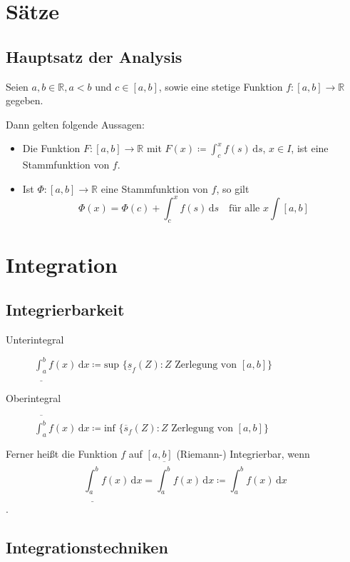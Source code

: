 		\section{Sätze}
			\subsection{Hauptsatz der Analysis}
				Seien $ a, b \in \mathbb{R}, a < b $ und $ c \in [a, b] $, sowie eine stetige Funktion $ f : [a, b] \rightarrow \mathbb{R} $ gegeben.

				Dann gelten folgende Aussagen:
				\begin{itemize}
					\item Die Funktion $ F : [a, b] \rightarrow \mathbb{R} $ mit $ F(x) \coloneqq \int _ c ^ x \! f(s) \, \mathrm{d}s $, $ x \in I $, ist eine Stammfunktion von $ f $.
					\item Ist $ \Phi : [a, b] \rightarrow \mathbb{R} $ eine Stammfunktion von $ f $, so gilt \[ \Phi(x) = \Phi(c) + \int _ c ^ x \! f(s) \, \mathrm{d}s \quad\text{für alle } x \int [a, b] \]
				\end{itemize}

		\section{Integration}
			\subsection{Integrierbarkeit}
				\begin{description}
					\item[Unterintegral] $ \underline{\int _ a ^ b} \! f(x) \, \mathrm{d}x \coloneqq \text{sup } \{ \underline{s} _ f (Z) : Z \text{ Zerlegung von } [a, b] \} $
					\item[Oberintegral] $ \overline{\int _ a ^ b} \! f(x) \, \mathrm{d}x \coloneqq \text{inf } \{ \overline{s} _ f (Z) : Z \text{ Zerlegung von } [a, b] \} $
				\end{description}

				Ferner heißt die Funktion $ f $ auf $ [a, b] $ (Riemann-) Integrierbar, wenn \[ \underline{\int _ a ^ b} \! f(x) \, \mathrm{d}x = \overline{\int _ a ^ b} \! f(x) \, \mathrm{d}x \coloneqq \int _ a ^ b \! f(x) \, \mathrm{d}x \].

			\subsection{Integrationstechniken}
